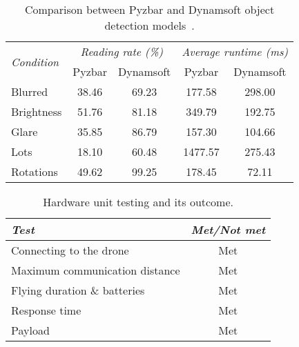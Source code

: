 \documentclass[../main.tex]{subfiles}
\begin{document}
\begin{table}[H]
    \centering
    \caption{Comparison between Pyzbar and Dynamsoft object detection
    models~\cite{dynamsoft,boofcv}.}
    \begin{tabularx}{0.65\textwidth}{ X c c c c }
        \toprule
        \multirow{2}{*}{\textit{Condition}}
            & \multicolumn{2}{c}{\textit{Reading rate (\%)}}
                & \multicolumn{2}{c}{\textit{Average runtime (ms)}} \\
                \addlinespace

        
            & Pyzbar
            & Dynamsoft
                & Pyzbar
                & Dynamsoft \\

        \midrule
        
        Blurred 
            & 38.46
            & 69.23
                & 177.58
                & 298.00
                \\
        
        Brightness
            & 51.76
            & 81.18
                & 349.79
                & 192.75
                \\
        
        Glare
            & 35.85
            & 86.79
                & 157.30
                & 104.66
                \\
        
        Lots
            & 18.10
            & 60.48
                & 1477.57
                & 275.43
                \\
        
        Rotations
            & 49.62
            & 99.25
                & 178.45
                & 72.11
                \\
        
        \bottomrule		
    \end{tabularx}
\end{table}

\begin{table}[H]
    \centering
    \caption{Hardware unit testing and its outcome.}
    \begin{tabularx}{0.57\textwidth}{ X c }
        \toprule
        \textit{Test} 
            & \textit{Met/Not met} \\

        \midrule
        
        Connecting to the drone
            & Met \\

        Maximum communication distance
            & Met \\

        Flying duration \& batteries
            & Met \\

        Response time
            & Met \\

        Payload
            & Met \\
        
        \bottomrule		
    \end{tabularx}
\end{table}
\end{document}
